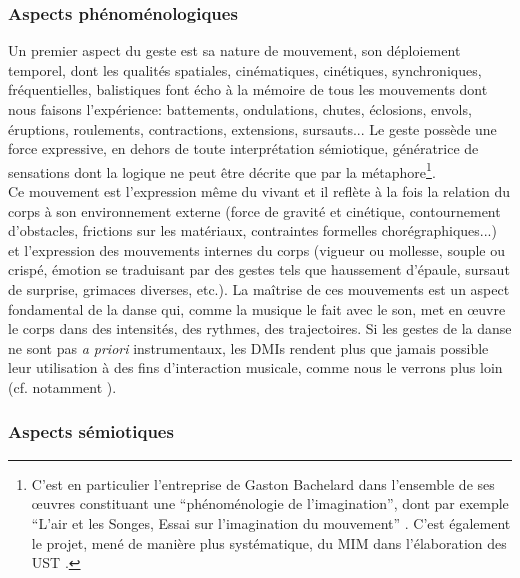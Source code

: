 \subsubsection{Aspects phénoménologiques}

\noindent Un premier aspect du geste est sa nature de mouvement, son déploiement temporel, dont les qualités spatiales, cinématiques, cinétiques, synchroniques, fréquentielles, balistiques font écho à la mémoire de tous les mouvements dont nous faisons l'expérience: battements, ondulations, chutes, éclosions, envols, éruptions, roulements, contractions, extensions, sursauts... Le geste possède une force expressive, en dehors de toute interprétation sémiotique, génératrice de sensations dont la logique ne peut être décrite que par la métaphore\footnote{C'est en particulier l'entreprise de Gaston Bachelard dans l'ensemble de ses œuvres constituant une ``phénoménologie de l'imagination'', dont par exemple ``L'air et les Songes, Essai sur l'imagination du mouvement'' \cite{bachelard_air_1943}. C'est également le projet, mené de manière plus systématique, du \gls{MIM} dans l'élaboration des \gls{UST} \cite{delalande_les_1996}.}.\\
\indent Ce mouvement est l'expression même du vivant et il reflète à la fois la relation du corps à son environnement externe (force de gravité et cinétique, contournement d'obstacles, frictions sur les matériaux, contraintes formelles chorégraphiques...) et l'expression des mouvements internes du corps (vigueur ou mollesse, souple ou crispé, émotion se traduisant par des gestes tels que haussement d'épaule, sursaut de surprise, grimaces diverses, etc.). La maîtrise de ces mouvements est un aspect fondamental de la danse qui, comme la musique le fait avec le son, met en œuvre le corps dans des intensités, des rythmes, des trajectoires. Si les gestes de la danse ne sont pas \textit{a priori} instrumentaux, les \glspl{DMI} rendent plus que jamais possible leur utilisation à des fins d'interaction musicale, comme nous le verrons plus loin (cf. notamment \cite{bevilacqua_gesture_2011, alaoui_movement_2012, silang_maranan_designing_2014, hsueh_understanding_2019}).

\subsubsection{Aspects sémiotiques}

